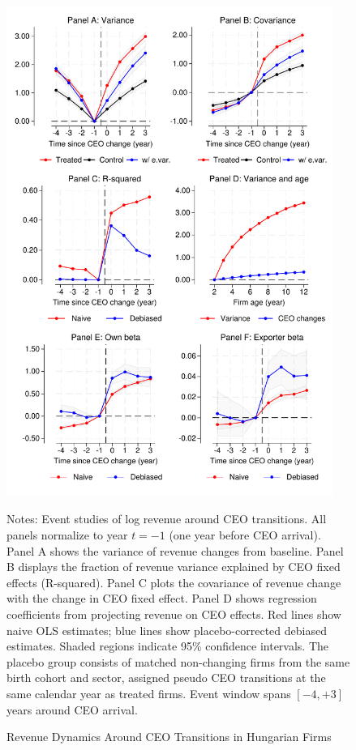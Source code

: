 \documentclass[11pt,a4paper]{article}
\begin{document}
\begin{figure}[htbp]
\centering
\includegraphics[width=0.95\textwidth]{figure/application.pdf}
\caption{Revenue Dynamics Around CEO Transitions in Hungarian Firms}
\label{fig:application}
\begin{minipage}{0.95\textwidth}
\footnotesize
Notes: Event studies of log revenue around CEO transitions. All panels normalize to year $t=-1$ (one year before CEO arrival). Panel A shows the variance of revenue changes from baseline. Panel B displays the fraction of revenue variance explained by CEO fixed effects (R-squared). Panel C plots the covariance of revenue change with the change in CEO fixed effect. Panel D shows regression coefficients from projecting revenue on CEO effects. Red lines show naive OLS estimates; blue lines show placebo-corrected debiased estimates. Shaded regions indicate 95\% confidence intervals. The placebo group consists of matched non-changing firms from the same birth cohort and sector, assigned pseudo CEO transitions at the same calendar year as treated firms. Event window spans $[-4, +3]$ years around CEO arrival.
\end{minipage}
\end{figure}
\end{document}
